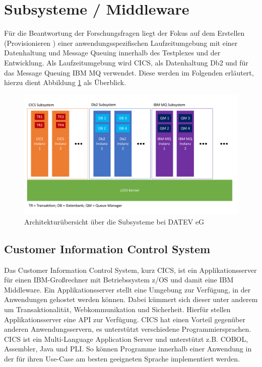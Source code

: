 \section{Subsysteme / Middleware}
Für die Beantwortung der Forschungsfragen liegt der Fokus auf dem Erstellen (\glqq Provisionieren \grqq) einer anwendungsspezifischen Laufzeitumgebung mit einer Datenhaltung und Message Queuing innerhalb des Testplexes und der Entwicklung.
Als Laufzeitumgebung wird \glqq CICS\grqq, als Datenhaltung \glqq Db2\grqq{} und für das Message Queuing \glqq IBM MQ\grqq{} verwendet.
Diese werden im Folgenden erläutert, hierzu dient Abbildung \ref{fig:archüber} als Überblick.

\begin{figure}[h]
\centering
\includegraphics[width=\textwidth]{figures/architektur.pdf}
\caption{Architekturübersicht über die Subsysteme bei DATEV eG}
\label{fig:archüber}
\end{figure}

\subsection{Customer Information Control System}\label{cics}
Das Customer Information Control System, kurz CICS, ist ein Applikationsserver für einen IBM-Großrechner mit Betriebssystem z/OS und damit eine IBM Middleware.
Ein Applikationsserver stellt eine Umgebung zur Verfügung, in der Anwendungen gehostet werden können.
Dabei kümmert sich dieser unter anderem um Transaktionalität, Webkommunikation und Sicherheit.
Hierfür stellen Applikationsserver eine API zur Verfügung.
CICS hat einen Vorteil gegenüber anderen Anwendungsservern, es unterstützt verschiedene Programmiersprachen.
CICS ist ein Multi-Language Application Server und unterstützt z.B. COBOL, Assembler, Java und PLI.
So können Programme innerhalb einer Anwendung in der für ihren Use-Case am besten geeigneten Sprache implementiert werden.
\cite{Rayns.2011}

